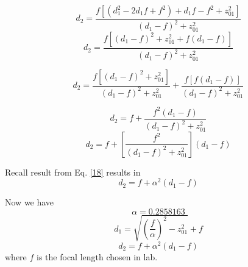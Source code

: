\documentclass[11pt, letterpaper]{article}
\begin{document}
\begin{enumerate}
\begin{enumerate}
$$d_2 = \frac{f \left[(d_1^2 - 2d_1 f + f^2) + d_1 f - f^2 + z_{01}^2\right]}{(d_1 - f)^2 + z_{01}^2}$$
$$d_2 = \frac{f \left[(d_1 - f)^2 + z_{01}^2 + f(d_1 - f)\right]}{(d_1 - f)^2 + z_{01}^2}$$


$$d_2 = \frac{f \left[(d_1 - f)^2 + z_{01}^2\right]}{(d_1 - f)^2 + z_{01}^2} + \frac{f \left[f(d_1 - f)\right]}{(d_1 - f)^2 + z_{01}^2}$$

$$d_2 = f + \frac{f^2(d_1 - f)}{(d_1 - f)^2 + z_{01}^2}$$
$$d_2 = f + \left[ \frac{f^2}{(d_1 - f)^2 + z_{01}^2} \right](d_1 - f)$$

Recall result from Eq. \ref{18} results in 
$$d_2 = f + \alpha^2(d_1 - f)$$

Now we have 
$$\alpha=0.2858163$$
$$d_1= \sqrt{\left(\frac{f}{\alpha}\right)^2-z_{01}^2}+f$$
$$d_2 = f + \alpha^2(d_1 - f)$$
where $f$ is the focal length chosen in lab.
\end{enumerate}

\end{enumerate}
\end{document}
